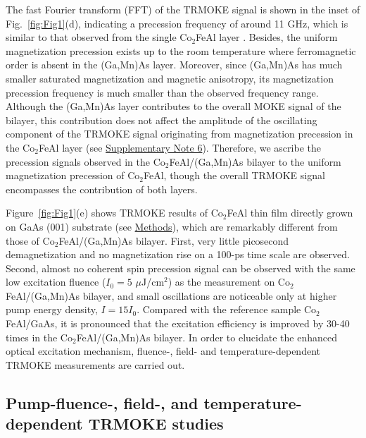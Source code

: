 \documentclass[%
 reprint,
superscriptaddress,
 amsmath,amssymb,
 aps,
prl,
]{revtex4-1}
\begin{document}
The fast Fourier transform (FFT) of the TRMOKE signal is shown in the inset of Fig.~\ref{fig:Fig1}(d), indicating a precession frequency of around 11 GHz, which is similar to that observed from the single Co$_2$FeAl layer \cite{25}. Besides, the uniform magnetization precession exists up to the room temperature where ferromagnetic order is absent in the (Ga,Mn)As layer. Moreover, since (Ga,Mn)As has much smaller saturated magnetization and magnetic anisotropy, its magnetization precession frequency is much smaller than the observed frequency range.\cite{26,27} Although the (Ga,Mn)As layer contributes to the overall MOKE signal of the bilayer, this contribution does not affect the amplitude of the oscillating component of the TRMOKE signal originating from magnetization precession in the Co$_2$FeAl layer (see \hyperref[sec:Supplementary]{Supplementary Note 6}). Therefore, we ascribe the precession signals observed in the Co$_2$FeAl/(Ga,Mn)As bilayer to the uniform magnetization precession of Co$_2$FeAl, though the overall TRMOKE signal encompasses the contribution of both layers.


Figure~\ref{fig:Fig1}(e)  shows TRMOKE results of Co$_2$FeAl thin film directly grown on GaAs (001) substrate (see \hyperref[sec:Methods]{Methods}), which are remarkably different from those of Co$_2$FeAl/(Ga,Mn)As bilayer. First, very little picosecond demagnetization and no magnetization rise on a 100-ps time scale are observed. Second, almost no coherent spin precession signal can be observed with the same low excitation fluence ($I_{0}=5$ $\mu$J/cm$^{2}$) as the measurement on Co$_2$FeAl/(Ga,Mn)As bilayer, and small oscillations are noticeable only at higher pump energy density, $I=15I_{0}$. Compared with the reference sample Co$_2$FeAl/GaAs, it is pronounced that the excitation efficiency is improved by 30-40 times in the Co$_2$FeAl/(Ga,Mn)As bilayer. In order to elucidate the enhanced optical excitation mechanism, fluence-, field- and temperature-dependent TRMOKE measurements are carried out.

\subsection{Pump-fluence-, field-, and temperature-dependent TRMOKE studies}
\end{document}
